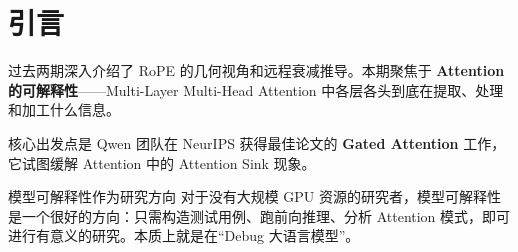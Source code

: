 \section{引言}

过去两期深入介绍了 RoPE 的几何视角和远程衰减推导。本期聚焦于 \textbf{Attention 的可解释性}——Multi-Layer Multi-Head Attention 中各层各头到底在提取、处理和加工什么信息。

核心出发点是 Qwen 团队在 NeurIPS 获得最佳论文的 \textbf{Gated Attention} 工作，它试图缓解 Attention 中的 Attention Sink 现象。

\begin{knowledgebox}{模型可解释性作为研究方向}
对于没有大规模 GPU 资源的研究者，模型可解释性是一个很好的方向：只需构造测试用例、跑前向推理、分析 Attention 模式，即可进行有意义的研究。本质上就是在``Debug 大语言模型''。
\end{knowledgebox}

